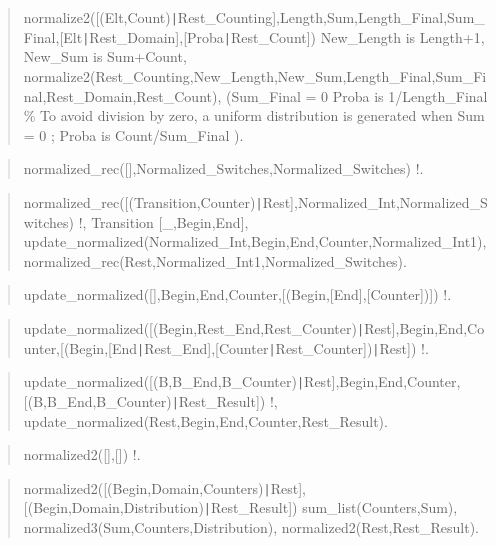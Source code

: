 \begin{quote}
normalize2([(Elt,Count){\tt\string|}Rest_Counting],Length,Sum,Length_Final,Sum_Final,[Elt{\tt\string|}Rest_Domain],[Proba{\tt\string|}Rest_Count]) \Sneck{}
New_Length is Length+1,
New_Sum is Sum+Count,
normalize2(Rest_Counting,New_Length,New_Sum,Length_Final,Sum_Final,Rest_Domain,Rest_Count),
(Sum_Final = 0 \Sifthen{}
Proba is 1/Length_Final \% To avoid division by zero, a uniform distribution is generated when Sum = 0
;
Proba is Count/Sum_Final
).
\end{quote}

\begin{quote}
normalized_rec([],Normalized_Switches,Normalized_Switches) \Sneck{}
!.
\end{quote}

\begin{quote}
normalized_rec([(Transition,Counter){\tt\string|}Rest],Normalized_Int,Normalized_Switches) \Sneck{}
!,
Transition \Suniv{} [_,Begin,End],
update_normalized(Normalized_Int,Begin,End,Counter,Normalized_Int1),
normalized_rec(Rest,Normalized_Int1,Normalized_Switches).
\end{quote}

\begin{quote}
update_normalized([],Begin,End,Counter,[(Begin,[End],[Counter])]) \Sneck{}
!.
\end{quote}

\begin{quote}
update_normalized([(Begin,Rest_End,Rest_Counter){\tt\string|}Rest],Begin,End,Counter,[(Begin,[End{\tt\string|}Rest_End],[Counter{\tt\string|}Rest_Counter]){\tt\string|}Rest]) \Sneck{}
!.
\end{quote}

\begin{quote}
update_normalized([(B,B_End,B_Counter){\tt\string|}Rest],Begin,End,Counter,[(B,B_End,B_Counter){\tt\string|}Rest_Result]) \Sneck{}
!,
update_normalized(Rest,Begin,End,Counter,Rest_Result).
\end{quote}

\begin{quote}
normalized2([],[]) \Sneck{}
!.
\end{quote}

\begin{quote}
normalized2([(Begin,Domain,Counters){\tt\string|}Rest],[(Begin,Domain,Distribution){\tt\string|}Rest_Result]) \Sneck{}
sum_list(Counters,Sum),
normalized3(Sum,Counters,Distribution),
normalized2(Rest,Rest_Result).
\end{quote}

